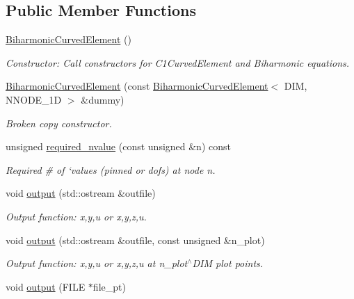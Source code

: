 \subsection*{Public Member Functions}
\begin{DoxyCompactItemize}
\item 
\hyperlink{classoomph_1_1BiharmonicCurvedElement_a29bf3b21c60da246d8bc9abfd0e91bf5}{Biharmonic\+Curved\+Element} ()
\begin{DoxyCompactList}\small\item\em Constructor\+: Call constructors for C1\+Curved\+Element and Biharmonic equations. \end{DoxyCompactList}\item 
\hyperlink{classoomph_1_1BiharmonicCurvedElement_a20723b0ce340d7ddb7823f83c3d504ee}{Biharmonic\+Curved\+Element} (const \hyperlink{classoomph_1_1BiharmonicCurvedElement}{Biharmonic\+Curved\+Element}$<$ D\+IM, N\+N\+O\+D\+E\+\_\+1D $>$ \&dummy)
\begin{DoxyCompactList}\small\item\em Broken copy constructor. \end{DoxyCompactList}\item 
unsigned \hyperlink{classoomph_1_1BiharmonicCurvedElement_a335d075769ca949eed1d1ab5482a6e46}{required\+\_\+nvalue} (const unsigned \&n) const
\begin{DoxyCompactList}\small\item\em Required \# of `values\textquotesingle{} (pinned or dofs) at node n. \end{DoxyCompactList}\item 
void \hyperlink{classoomph_1_1BiharmonicCurvedElement_a702f7fef5954cb750e30579ce4a8a0da}{output} (std\+::ostream \&outfile)
\begin{DoxyCompactList}\small\item\em Output function\+: x,y,u or x,y,z,u. \end{DoxyCompactList}\item 
void \hyperlink{classoomph_1_1BiharmonicCurvedElement_ac6229a99465efed7ef1852806f12772e}{output} (std\+::ostream \&outfile, const unsigned \&n\+\_\+plot)
\begin{DoxyCompactList}\small\item\em Output function\+: x,y,u or x,y,z,u at n\+\_\+plot$^\wedge$\+D\+IM plot points. \end{DoxyCompactList}\item 
void \hyperlink{classoomph_1_1BiharmonicCurvedElement_a6bb84710cab6c0c27c90e2b0675ff6cd}{output} (F\+I\+LE $\ast$file\+\_\+pt)

\end{DoxyCompactItemize}
